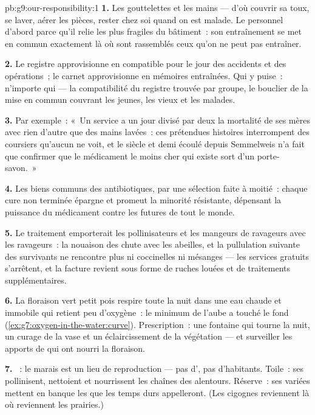 \begin{solution}{pb:g9:our-responsibility:1}
\textbf{1.} Les gouttelettes et les mains --- d'où couvrir
sa toux, se laver, aérer les pièces, rester chez soi quand
on est malade. Le personnel d'abord parce qu'il relie les
plus fragiles du bâtiment~: son entraînement se met en
commun exactement là où sont rassemblés ceux qu'on ne peut
pas entraîner.

\textbf{2.} Le registre approvisionne en  compatible
pour le jour des accidents et des opérations~; le carnet
approvisionne en mémoires entraînées. Qui y puise~:
n'importe qui --- la compatibilité du registre trouvée par
groupe, le bouclier de la mise en commun couvrant les
jeunes, les vieux et les malades.

\textbf{3.} Par exemple~: «~Un service a un jour divisé par
deux la mortalité de ses mères avec rien d'autre que des
mains lavées~: ces prétendues histoires interrompent des
coursiers qu'aucun  ne voit, et le siècle et demi écoulé
depuis Semmelweis n'a fait que confirmer que le médicament
le moins cher qui existe sort d'un porte-savon.~»

\textbf{4.} Les biens communs des antibiotiques, par une
sélection faite à moitié~: chaque cure non terminée épargne
et promeut la minorité résistante, dépensant la puissance du
médicament contre les  futures de tout le monde.

\textbf{5.} Le traitement emporterait les pollinisateurs et
les mangeurs de ravageurs avec les ravageurs~: la nouaison
des  chute avec les abeilles, et la pullulation
suivante des survivants ne rencontre plus ni coccinelles ni
mésanges --- les services gratuits s'arrêtent, et la facture
revient sous forme de ruches louées et de traitements
supplémentaires.

\textbf{6.} La floraison vert petit pois respire toute la
nuit dans une eau chaude et immobile qui retient peu
d'oxygène~: le minimum de l'aube a touché le fond
(\cref{ex:g7:oxygen-in-the-water:curve}). Prescription~:
une fontaine qui tourne la nuit, un curage de la vase et un
éclaircissement de la végétation --- et surveiller les
apports de  qui ont nourri la floraison.

\textbf{7.} ~: le marais est un lieu de
reproduction --- pas d', pas d'habitants. Toile~: ses
 pollinisent, nettoient et nourrissent les chaînes
des alentours. Réserve~: ses  variées mettent en
banque les  que les temps durs appelleront. (Les
cigognes reviennent là où reviennent les prairies.)


\end{solution}
